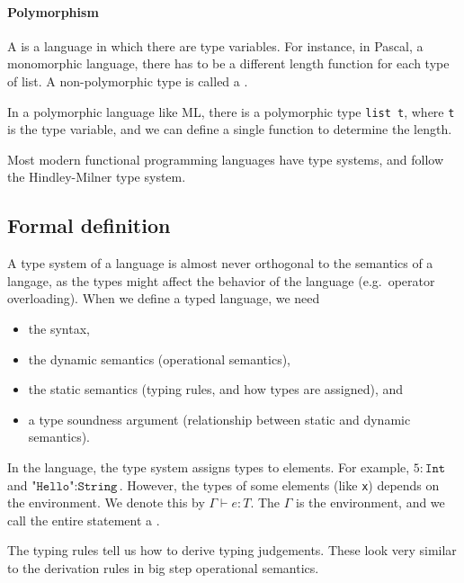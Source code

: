 \documentclass[class=scrartcl]{standalone}
\begin{document}
\paragraph{Polymorphism}
A  is a language in which
there are type variables.
For instance, in Pascal, a monomorphic language,
there has to be a different length function for each type of list.
A non-polymorphic type is called a .

In a polymorphic language like ML, there is a polymorphic type
\texttt{list t}, where \texttt{t} is the type variable,
and we can define a single function to determine the length.

Most modern functional programming languages have type systems,
and follow the Hindley-Milner type system.

\subsection{Formal definition}
A type system of a language is almost never orthogonal
to the semantics of a langage, as the types might affect
the behavior of the language (e.g.\ operator overloading).
When we define a typed language, we need
\begin{itemize}[nosep]
  \item the syntax,
  \item the dynamic semantics (operational semantics),
  \item the static semantics (typing rules, and how types are assigned), and
  \item a type soundness argument
        (relationship between static and dynamic semantics).
\end{itemize}

In the language, the type system assigns types to elements.
For example, \(5 : \texttt{Int}\)
and \(\texttt{"Hello"} : \texttt{String}\). %
However, the types of some elements (like \texttt{x})
depends on the environment.
We denote this by \(\Gamma \vdash e : T\).
The \(\Gamma\) is the environment,
and we call the entire statement a .

The typing rules tell us how to derive typing judgements.
These look very similar to the derivation rules
in big step operational semantics.
\end{document}
